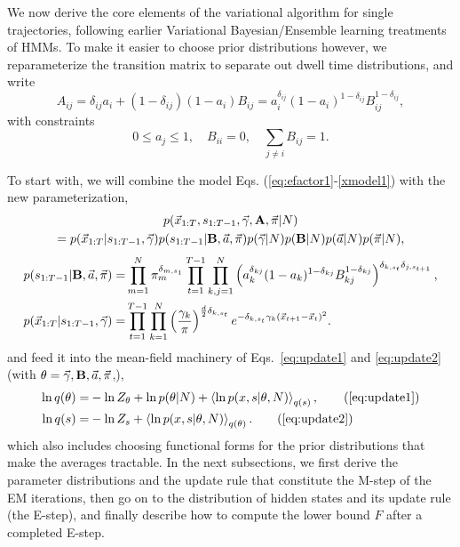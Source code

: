 We now derive the core elements of the variational algorithm for
single trajectories, following earlier Variational Bayesian/Ensemble
learning treatments of HMMs\cite{Bronson2010,Mackay1997,Beal2003}.  To
make it easier to choose prior distributions however, we
reparameterize the transition matrix to separate out dwell time
distributions, and write
\begin{equation}\label{eq:aBdef}
A_{ij}=\delta_{ij}a_i+(1-\delta_{ij})(1-a_i)B_{ij}=
a_i^{\delta_{ij}}(1-a_i)^{1-\delta_{ij}}B_{ij}^{1-\delta_{ij}},
\end{equation}
with constraints
\begin{equation}
0\le a_j\le 1,\quad B_{ii}=0,\quad \sum_{j\ne i}B_{ij}=1.
\end{equation}

To start with, we will combine the model
Eqs. (\ref{eq:efactor1}-\ref{xmodel1}) with the new parameterization,
\begin{multline}
\label{eq:efactor1b}
p(\vec{x}_{1:T},s_{1:T-1},\vec{\gamma},\mathbf{A},\vec\pi|N)\\
=p(\vec{x}_{1:T}|s_{1:T-1},\vec{\gamma})
p(s_{1:T-1}|\mathbf{B},\vec{a},\vec\pi)
p(\vec{\gamma}|N)p(\mathbf{B}|N)p(\vec{a}|N)p(\vec\pi|N),
\end{multline}
\begin{align}
\label{smodel1b}
  p(s_{1:T-1}|\mathbf{B},\vec a,\vec{\pi})=&
  \prod_{m=1}^N\pi_m^{\delta_{m,s_1}}
  \prod_{t=1}^{T-1}\prod_{k,j=1}^N 
  \left(a_k^{\delta_{kj}}(1-a_k)^{1-\delta_{kj}}
  B_{kj}^{1-\delta_{kj}}\right)^{\delta_{k,s_t}\delta_{j,s_{t+1}}},\\
    \label{xmodel1b}
    p(\vec{x}_{1:T}|s_{1:T-1},\vec\gamma)=&
    \prod_{t=1}^{T-1}\prod_{k=1}^N\left(
    \frac{\gamma_k}{\pi}\right)^{\frac d2\delta_{k,s_t}}
    e^{-\delta_{k,s_t}\gamma_k(\vec{x}_{t+1}-\vec{x}_t)^2}. 
\end{align}
and feed it into the mean-field machinery of Eqs.~\eqref{eq:update1}
and \eqref{eq:update2} (with
$\theta=\vec{\gamma},\mathbf{B},\vec{a},\vec{\pi}$,),
\begin{align}
  \ln q(\theta)=&-\ln Z_\theta+\ln p(\theta|N)
  +\mean{\ln p(x,s|\theta,N)}_{q(s)},\tag{\ref{eq:update1}}\\
  \ln q(s)=&-\ln Z_s+\mean{\ln p(x,s|\theta,N)}_{q(\theta)}.
\tag{\ref{eq:update2}}
\end{align}
which also includes choosing functional forms for the prior
distributions that make the averages tractable. In the next
subsections, we first derive the parameter distributions and the
update rule that constitute the M-step of the EM iterations, then go on
to the distribution of hidden states and its update rule (the E-step),
and finally describe how to compute the lower bound $F$ after a
completed E-step.

